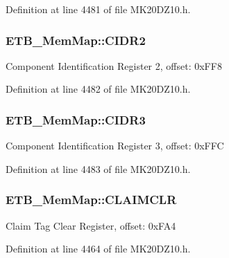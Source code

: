 Definition at line 4481 of file M\+K20\+D\+Z10.\+h.

\subsubsection[{\texorpdfstring{C\+I\+D\+R2}{CIDR2}}]{ E\+T\+B\+\_\+\+Mem\+Map\+::\+C\+I\+D\+R2}\hypertarget{struct_e_t_b___mem_map_a21c4d78f89b6495cdcd781c34f483f42}{}\label{struct_e_t_b___mem_map_a21c4d78f89b6495cdcd781c34f483f42}
Component Identification Register 2, offset\+: 0x\+F\+F8 

Definition at line 4482 of file M\+K20\+D\+Z10.\+h.

\subsubsection[{\texorpdfstring{C\+I\+D\+R3}{CIDR3}}]{ E\+T\+B\+\_\+\+Mem\+Map\+::\+C\+I\+D\+R3}\hypertarget{struct_e_t_b___mem_map_a54c5d31e149764075338797e0705a826}{}\label{struct_e_t_b___mem_map_a54c5d31e149764075338797e0705a826}
Component Identification Register 3, offset\+: 0x\+F\+FC 

Definition at line 4483 of file M\+K20\+D\+Z10.\+h.

\subsubsection[{\texorpdfstring{C\+L\+A\+I\+M\+C\+LR}{CLAIMCLR}}]{ E\+T\+B\+\_\+\+Mem\+Map\+::\+C\+L\+A\+I\+M\+C\+LR}\hypertarget{struct_e_t_b___mem_map_a0cb75f3c7b540c1f7745a67001822749}{}\label{struct_e_t_b___mem_map_a0cb75f3c7b540c1f7745a67001822749}
Claim Tag Clear Register, offset\+: 0x\+F\+A4 

Definition at line 4464 of file M\+K20\+D\+Z10.\+h.

